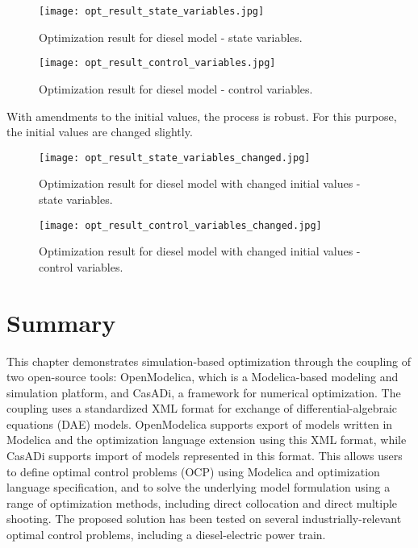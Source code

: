 \begin{figure} [!h]
	\texttt{[image: opt\_result\_state\_variables.jpg]}
	\caption{Optimization result for diesel model - state variables.}
	\label{fig:optimizationresultstatevariables}
\end{figure}

\begin{figure} [!h]
	\texttt{[image: opt\_result\_control\_variables.jpg]}
	\caption{Optimization result for diesel model - control variables.}
	\label{fig:optimizationresultcontrolvariables}
\end{figure}

\clearpage
With amendments to the initial values, the process is robust. For this purpose, the initial values are changed slightly.

\begin{figure} [!h]
	\texttt{[image: opt\_result\_state\_variables\_changed.jpg]}
	\caption{Optimization result for diesel model with changed initial values - state variables.}
	\label{fig:optimizationresultchangedstatevariables}
\end{figure}

\begin{figure} [!h]
	\texttt{[image: opt\_result\_control\_variables\_changed.jpg]}
	\caption{Optimization result for diesel model with changed initial values - control variables.}
	\label{fig:optimizationresultchangedcontrolvariables}
\end{figure}

\clearpage
\section{Summary}
\label{sec:optimizationsummary}

This chapter demonstrates simulation-based optimization through the coupling of two open-source tools: OpenModelica, which is a Modelica-based modeling and simulation platform, and CasADi, a framework for numerical optimization. The coupling uses a standardized XML format for exchange of
differential-algebraic equations (DAE) models. OpenModelica supports export of models written in Modelica and the optimization language extension using this XML format, while CasADi supports import of models represented in this format. This allows users to define optimal control problems (OCP) using
Modelica and optimization language specification, and to solve the underlying model formulation using a range of optimization methods, including direct collocation and direct multiple shooting. The proposed solution has been tested on several industrially-relevant optimal control problems, including a diesel-electric power train.

